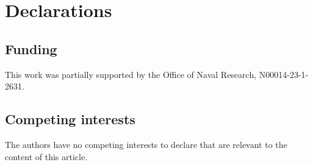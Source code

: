 \documentclass[11pt]{amsart}
\theoremstyle{plain}
\theoremstyle{definition}
\theoremstyle{remark}
\begin{document}
    \section*{Declarations}
    
    \subsection*{Funding}
    This work was partially supported by the Office of Naval Research, N00014-23-1-2631. 
    
    \subsection*{Competing interests}
    The authors have no competing interests to declare that are relevant to the content of this article.
	
	
	
	
\end{document}

